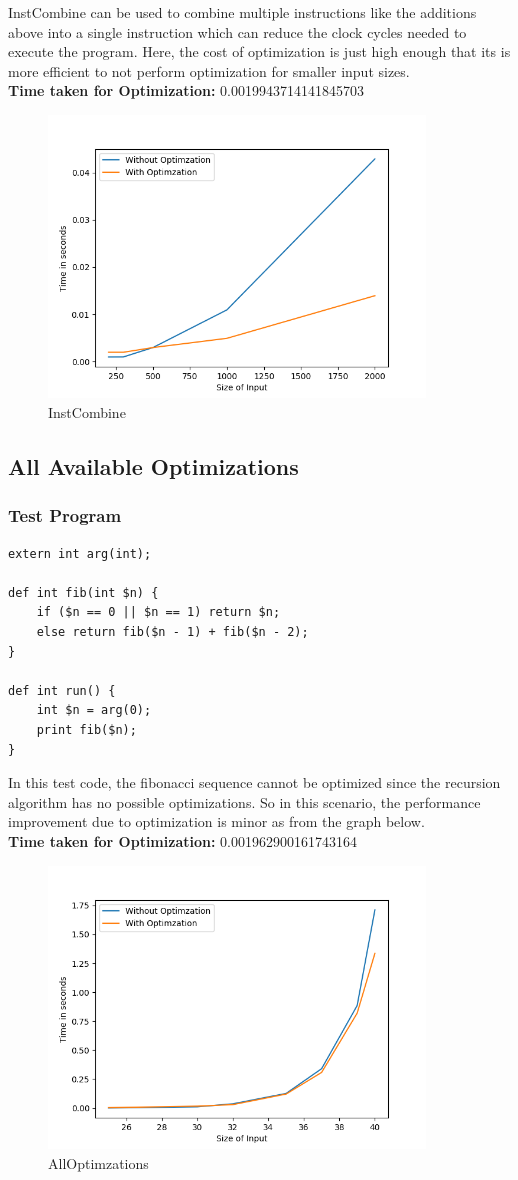 \documentclass[letter,11pt]{article}
\begin{document}
InstCombine can be used to combine multiple instructions like the additions above into a single instruction which can reduce the clock cycles needed to execute the program. Here, the cost of optimization is just high enough that its is more efficient to not perform optimization for smaller input sizes.\\
\textbf{Time taken for Optimization:} 0.0019943714141845703
\begin{figure}[H]
	\centering
	\includegraphics[width=10cm]{timing/2.png}
	\caption{InstCombine}
	\label{fig:instcombine}
\end{figure}

\subsection*{All Available Optimizations}

\subsubsection*{Test Program}

\begin{verbatim}
extern int arg(int);

def int fib(int $n) {
    if ($n == 0 || $n == 1) return $n;
    else return fib($n - 1) + fib($n - 2);
}

def int run() {
    int $n = arg(0);
    print fib($n);
}
\end{verbatim}

In this test code, the fibonacci sequence cannot be optimized since the recursion algorithm has no possible optimizations. So in this scenario, the performance improvement due to optimization is minor as from the graph below.\\
\textbf{Time taken for Optimization:} 0.001962900161743164

\begin{figure}[H]
	\centering
	\includegraphics[width=10cm]{timing/3.png}
	\caption{AllOptimzations}
	\label{fig:all}
\end{figure}

\end{document}
